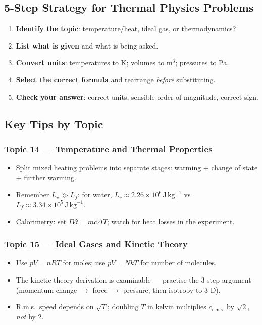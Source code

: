 \subsection{5-Step Strategy for Thermal Physics Problems}
\begin{enumerate}
  \item \textbf{Identify the topic}: temperature/heat, ideal gas, or thermodynamics?
  \item \textbf{List what is given} and what is being asked.
  \item \textbf{Convert units}: temperatures to K; volumes to m$^3$; pressures to Pa.
  \item \textbf{Select the correct formula} and rearrange \emph{before} substituting.
  \item \textbf{Check your answer}: correct units, sensible order of magnitude, correct sign.
\end{enumerate}

\subsection{Key Tips by Topic}

\subsubsection{Topic 14 — Temperature and Thermal Properties}
\begin{itemize}
  \item Split mixed heating problems into separate stages: warming + change of state
        + further warming.
  \item Remember $L_v \gg L_f$: for water,
        $L_v \approx 2.26\times10^6\,\mathrm{J\,kg}^{-1}$ vs
        $L_f \approx 3.34\times10^5\,\mathrm{J\,kg}^{-1}$.
  \item Calorimetry: set $IVt = mc\Delta T$; watch for heat losses in the experiment.
\end{itemize}

\subsubsection{Topic 15 — Ideal Gases and Kinetic Theory}
\begin{itemize}
  \item Use $pV = nRT$ for moles; use $pV = NkT$ for number of molecules.
  \item The kinetic theory derivation is examinable — practise the 3-step argument
        (momentum change $\to$ force $\to$ pressure, then isotropy to 3-D).
  \item R.m.s.\ speed depends on $\sqrt{T}$; doubling $T$ in kelvin multiplies
        $c_{\mathrm{r.m.s.}}$ by $\sqrt{2}$, \emph{not} by 2.
\end{itemize}

